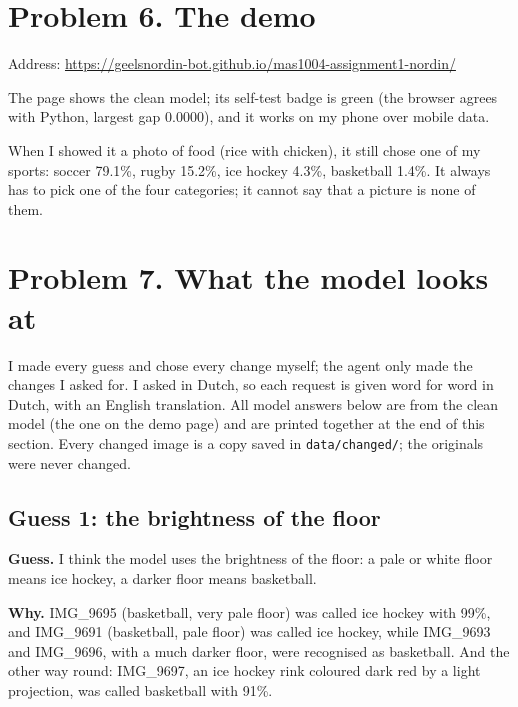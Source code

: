 \documentclass[11pt]{article}
\begin{document}
\section*{Problem 6. The demo}

Address: \url{https://geelsnordin-bot.github.io/mas1004-assignment1-nordin/}

The page shows the clean model; its self-test badge is green (the browser agrees
with Python, largest gap 0.0000), and it works on my phone over mobile data.

When I showed it a photo of food (rice with chicken), it still chose one of my
sports: soccer 79.1\%, rugby 15.2\%, ice hockey 4.3\%, basketball 1.4\%. It always
has to pick one of the four categories; it cannot say that a picture is none of
them.

\section*{Problem 7. What the model looks at}

I made every guess and chose every change myself; the agent only made the
changes I asked for. I asked in Dutch, so each request is given word for word in
Dutch, with an English translation. All model answers below are from the clean
model (the one on the demo page) and are printed together at the end of this
section. Every changed image is a copy saved in \texttt{data/changed/}; the
originals were never changed.

\subsection*{Guess 1: the brightness of the floor}

\textbf{Guess.} I think the model uses the brightness of the floor: a pale or
white floor means ice hockey, a darker floor means basketball.

\textbf{Why.} IMG\_9695 (basketball, very pale floor) was called ice hockey with
99\%, and IMG\_9691 (basketball, pale floor) was called ice hockey, while IMG\_9693
and IMG\_9696, with a much darker floor, were recognised as basketball. And the
other way round: IMG\_9697, an ice hockey rink coloured dark red by a light
projection, was called basketball with 91\%.
\end{document}
